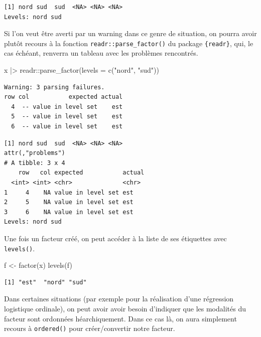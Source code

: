 \documentclass[
  letterpaper,
  DIV=11,
  numbers=noendperiod,
  oneside]{scrreprt}
\newenvironment{Shaded}{\begin{snugshade}}{\end{snugshade}}
\newcommand{\AttributeTok}[1]{\textcolor[rgb]{0.40,0.45,0.13}{#1}}
\newcommand{\FunctionTok}[1]{\textcolor[rgb]{0.28,0.35,0.67}{#1}}
\newcommand{\NormalTok}[1]{\textcolor[rgb]{0.00,0.23,0.31}{#1}}
\newcommand{\OtherTok}[1]{\textcolor[rgb]{0.00,0.23,0.31}{#1}}
\newcommand{\SpecialCharTok}[1]{\textcolor[rgb]{0.37,0.37,0.37}{#1}}
\newcommand{\StringTok}[1]{\textcolor[rgb]{0.13,0.47,0.30}{#1}}
\begin{document}
\begin{verbatim}
[1] nord sud  sud  <NA> <NA> <NA>
Levels: nord sud
\end{verbatim}

Si l'on veut être averti par un warning dans ce genre de situation, on
pourra avoir plutôt recours à la fonction
\texttt{readr::parse\_factor()} du package \texttt{\{readr\}}, qui, le
cas échéant, renverra un tableau avec les problèmes rencontrés.

\begin{Shaded}
\begin{Highlighting}[]
\NormalTok{x }\SpecialCharTok{|\textgreater{}} 
\NormalTok{  readr}\SpecialCharTok{::}\FunctionTok{parse\_factor}\NormalTok{(}\AttributeTok{levels =} \FunctionTok{c}\NormalTok{(}\StringTok{"nord"}\NormalTok{, }\StringTok{"sud"}\NormalTok{))}
\end{Highlighting}
\end{Shaded}

\begin{verbatim}
Warning: 3 parsing failures.
row col           expected actual
  4  -- value in level set    est
  5  -- value in level set    est
  6  -- value in level set    est
\end{verbatim}

\begin{verbatim}
[1] nord sud  sud  <NA> <NA> <NA>
attr(,"problems")
# A tibble: 3 x 4
    row   col expected           actual
  <int> <int> <chr>              <chr> 
1     4    NA value in level set est   
2     5    NA value in level set est   
3     6    NA value in level set est   
Levels: nord sud
\end{verbatim}

Une fois un facteur créé, on peut accéder à la liste de ses étiquettes
avec \texttt{levels()}.

\begin{Shaded}
\begin{Highlighting}[]
\NormalTok{f }\OtherTok{\textless{}{-}} \FunctionTok{factor}\NormalTok{(x)}
\FunctionTok{levels}\NormalTok{(f)}
\end{Highlighting}
\end{Shaded}

\begin{verbatim}
[1] "est"  "nord" "sud" 
\end{verbatim}

Dans certaines situations (par exemple pour la réalisation d'une
régression logistique ordinale), on peut avoir avoir besoin d'indiquer
que les modalités du facteur sont ordonnées héarchiquement. Dans ce cas
là, on aura simplement recours à \texttt{ordered()} pour créer/convertir
notre facteur.
\end{document}
